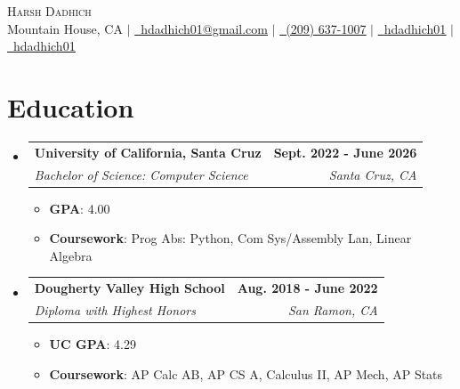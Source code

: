 \documentclass[letterpaper,11pt]{article}
\makeatletter
\newcommand{\resumeSubheading}[4]{
  \vspace{-2pt}\item
    \begin{tabular*}{1.0\textwidth}[t]{l@{\extracolsep{\fill}}r}
      \textbf{#1} & \textbf{\small #2} \\
      \textit{\small#3} & \textit{\small #4} \\
    \end{tabular*}\vspace{-7pt}
}
\newcommand{\resumeSubHeadingListStart}{\begin{itemize}[leftmargin=0.0in, label={}]}
\newcommand{\resumeSubHeadingListEnd}{\end{itemize}}
\makeatother
\begin{document}

\begin{center}
	{\Huge \scshape Harsh Dadhich} \\ \vspace{1pt}
	Mountain House, CA $|$ \href{mailto:hdadhich01@gmail.com}{\faEnvelope~\underline{hdadhich01@gmail.com}} $|$ \href{tel:+12096371007}{\small \raisebox{-0.1\height}\faPhone~\underline{(209) 637-1007}} $|$ \href{https://linkedin.com/in/hdadhich01}{\faLinkedin~\underline{hdadhich01}} $|$ \href{https://github.com/hdadhich01}{\faGithub~\underline{hdadhich01}}
	\vspace{-5pt}
\end{center}

\section{Education}
\resumeSubHeadingListStart
\resumeSubheading
{University of California, Santa Cruz}{Sept. 2022 - June 2026}
{Bachelor of Science: Computer Science}{Santa Cruz, CA}
\begin{itemize}[itemsep=-1pt, parsep=1pt]
	\item\small \textbf{GPA}{: 4.00}
	\item \textbf{Coursework}{: Prog Abs: Python, Com Sys/Assembly Lan, Linear Algebra}
\end{itemize}
\resumeSubheading
{Dougherty Valley High School}{Aug. 2018 - June 2022}
{Diploma with Highest Honors}{San Ramon, CA}
\begin{itemize}[itemsep=-1pt, parsep=1pt]
	\item\small \textbf{UC GPA}{: 4.29}
	\item \textbf{Coursework}{: AP Calc AB, AP CS A, Calculus II, AP Mech, AP Stats}
\end{itemize}
\resumeSubHeadingListEnd
\vspace{-15pt}
\end{document}
